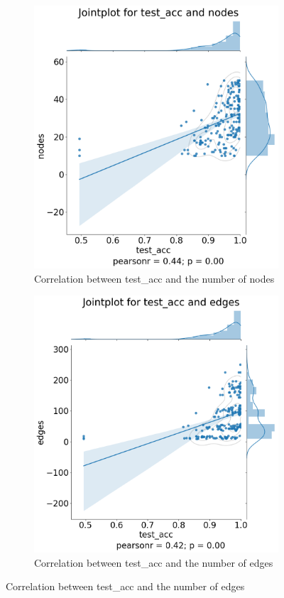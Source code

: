 \begin{figure}[H]
    \centering
    \begin{subfigure}{0.45\textwidth}
        \includegraphics[width=\linewidth]{images/results/random/lstm/jointplot_test_acc_nodes.png}
        \caption{Correlation between test\_acc and the number of nodes} \label{fig:jp_lstm_node}
    \end{subfigure}%
    \hfill
    \begin{subfigure}{0.45\textwidth}
        \includegraphics[width=\linewidth]{images/results/random/lstm/jointplot_test_acc_edges.png}
        \caption{Correlation between test\_acc and the number of edges} \label{fig:jp_lstm_edge}
    \end{subfigure}%
  

\end{figure}
